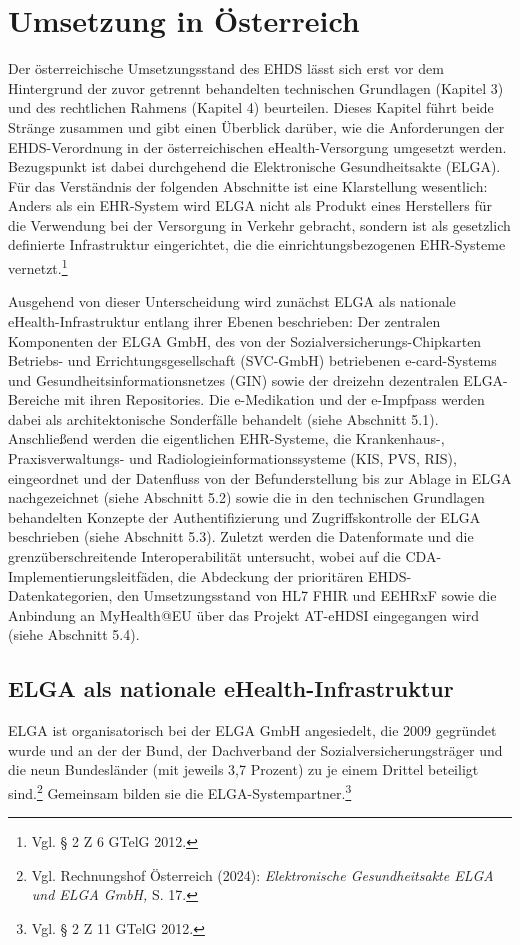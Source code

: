 \chapter{Umsetzung in Österreich}
Der österreichische Umsetzungsstand des EHDS lässt sich erst vor dem Hintergrund der zuvor getrennt behandelten technischen Grundlagen (Kapitel 3) und des rechtlichen Rahmens (Kapitel 4) beurteilen. Dieses Kapitel führt beide Stränge zusammen und gibt einen Überblick darüber, wie die Anforderungen der EHDS-Verordnung in der österreichischen eHealth-Versorgung umgesetzt werden. Bezugspunkt ist dabei durchgehend die Elektronische Gesundheitsakte (ELGA). Für das Verständnis der folgenden Abschnitte ist eine Klarstellung wesentlich: Anders als ein EHR-System wird ELGA nicht als Produkt eines Herstellers für die Verwendung bei der Versorgung in Verkehr gebracht, sondern ist als gesetzlich definierte Infrastruktur eingerichtet, die die einrichtungsbezogenen EHR-Systeme vernetzt.\footnote{Vgl. § 2 Z 6 GTelG 2012.}

Ausgehend von dieser Unterscheidung wird zunächst ELGA als nationale eHealth-Infrastruktur entlang ihrer Ebenen beschrieben: Der zentralen Komponenten der ELGA GmbH, des von der Sozialversicherungs-Chipkarten Betriebs- und Errichtungsgesellschaft (SVC-GmbH) betriebenen e-card-Systems und Gesundheitsinformationsnetzes (GIN) sowie der dreizehn dezentralen ELGA-Bereiche mit ihren Repositories. Die e-Medikation und der e-Impfpass werden dabei als architektonische Sonderfälle behandelt (siehe Abschnitt 5.1). Anschließend werden die eigentlichen EHR-Systeme, die Krankenhaus-, Praxisverwaltungs- und Radiologieinformationssysteme (KIS, PVS, RIS), eingeordnet und der Datenfluss von der Befunderstellung bis zur Ablage in ELGA nachgezeichnet (siehe Abschnitt 5.2) sowie die in den technischen Grundlagen behandelten Konzepte der Authentifizierung und Zugriffskontrolle der ELGA beschrieben (siehe Abschnitt 5.3). Zuletzt werden die Datenformate und die grenzüberschreitende Interoperabilität untersucht, wobei auf die CDA-Implementierungsleitfäden, die Abdeckung der prioritären EHDS-Datenkategorien, den Umsetzungsstand von HL7 FHIR und EEHRxF sowie die Anbindung an MyHealth@EU über das Projekt AT-eHDSI eingegangen wird (siehe Abschnitt 5.4).

\section{ELGA als nationale eHealth-Infrastruktur}
ELGA ist organisatorisch bei der ELGA GmbH angesiedelt, die 2009 gegründet wurde und an der der Bund, der Dachverband der Sozialversicherungsträger und die neun Bundesländer (mit jeweils 3,7 Prozent) zu je einem Drittel beteiligt sind.\footnote{Vgl. Rechnungshof Österreich (2024): \textit{Elektronische Gesundheitsakte ELGA und ELGA GmbH,} S. 17.} Gemeinsam bilden sie die ELGA-Systempartner.\footnote{Vgl. § 2 Z 11 GTelG 2012.}

